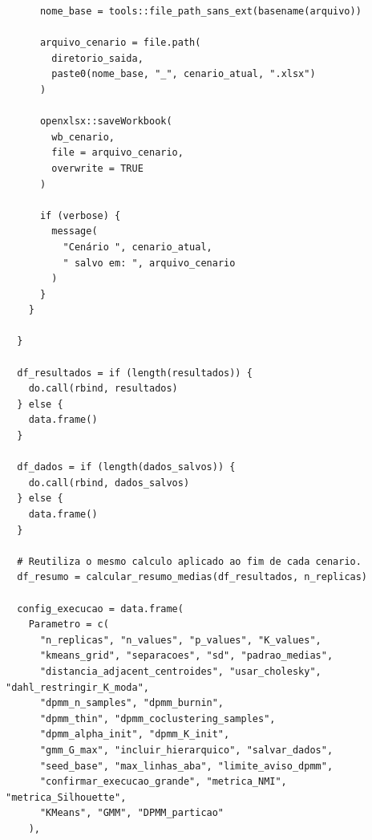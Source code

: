\begin{verbatim}
      nome_base = tools::file_path_sans_ext(basename(arquivo))
      
      arquivo_cenario = file.path(
        diretorio_saida,
        paste0(nome_base, "_", cenario_atual, ".xlsx")
      )
      
      openxlsx::saveWorkbook(
        wb_cenario,
        file = arquivo_cenario,
        overwrite = TRUE
      )
      
      if (verbose) {
        message(
          "Cenário ", cenario_atual,
          " salvo em: ", arquivo_cenario
        )
      }
    }
    
  }
  
  df_resultados = if (length(resultados)) {
    do.call(rbind, resultados)
  } else {
    data.frame()
  }
  
  df_dados = if (length(dados_salvos)) {
    do.call(rbind, dados_salvos)
  } else {
    data.frame()
  }
  
  # Reutiliza o mesmo calculo aplicado ao fim de cada cenario.
  df_resumo = calcular_resumo_medias(df_resultados, n_replicas)
  
  config_execucao = data.frame(
    Parametro = c(
      "n_replicas", "n_values", "p_values", "K_values",
      "kmeans_grid", "separacoes", "sd", "padrao_medias",
      "distancia_adjacent_centroides", "usar_cholesky", "dahl_restringir_K_moda",
      "dpmm_n_samples", "dpmm_burnin",
      "dpmm_thin", "dpmm_coclustering_samples",
      "dpmm_alpha_init", "dpmm_K_init",
      "gmm_G_max", "incluir_hierarquico", "salvar_dados",
      "seed_base", "max_linhas_aba", "limite_aviso_dpmm",
      "confirmar_execucao_grande", "metrica_NMI", "metrica_Silhouette",
      "KMeans", "GMM", "DPMM_particao"
    ),
    

\end{verbatim}

